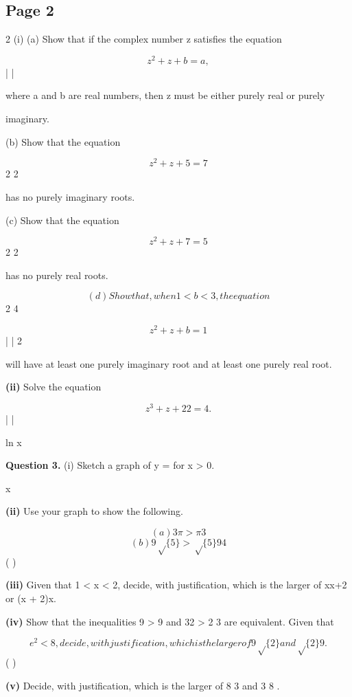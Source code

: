 \documentclass[12pt]{article}
\begin{document}
\subsection*{Page 2}
\begin{flushleft}
2 (i) (a) Show that if the complex number z satisfies the equation\par
\[z^2 + z + b = a,\]
| |\par
where a and b are real numbers, then z must be either purely real or purely\par
imaginary.\par
(b) Show that the equation\par
\[z^2 + z + 5 = 7\]
2 2\par
has no purely imaginary roots.\par
(c) Show that the equation\par
\[z^2 + z + 7 = 5\]
2 2\par
has no purely real roots.\par
\[(d) Show that, when 1 < b < 3 , the equation\]
2 4\par
\[z^2 + z + b = 1\]
| | 2\par
will have at least one purely imaginary root and at least one purely real root.\par
\textbf{(ii)} Solve the equation\par
\[z^3 + z + 2 2 = 4.\]
| |\par
ln x\par
\bigskip\textbf{Question 3.} (i) Sketch a graph of y = for x > 0.\par
x\par
\textbf{(ii)} Use your graph to show the following.\par
\[(a) 3\pi > \pi3\]
\[(b) 9 \sqrt\{5\} > \sqrt\{5\} 9 4\]
( )\par
\textbf{(iii)} Given that 1 < x < 2, decide, with justification, which is the larger of xx+2 or (x + 2)x.\par
\textbf{(iv)} Show that the inequalities 9 >  9 and 32 > 2 3 are equivalent. Given that\par
\[e^2 < 8, decide, with justification, which is the larger of 9\sqrt\{2\} and \sqrt\{2\} 9 .\]
( )\par
\textbf{(v)} Decide, with justification, which is the larger of 8  3 and  3 8 .\par
\end{flushleft}
\end{document}
